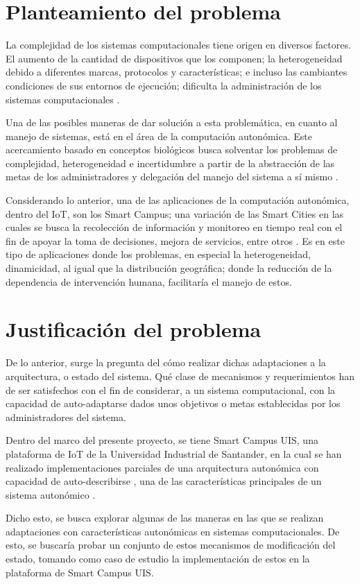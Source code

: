 \section{Planteamiento del problema}

La complejidad de los sistemas computacionales tiene origen en diversos factores. El aumento de la cantidad de dispositivos que los componen; la heterogeneidad debido a diferentes marcas, protocolos y características; e incluso las cambiantes condiciones de sus entornos de ejecución; dificulta la administración de los sistemas computacionales \cite{emerging_2005}.

Una de las posibles maneras de dar solución a esta problemática, en cuanto al manejo de sistemas, está en el área de la computación autonómica. Este acercamiento basado en conceptos biológicos busca solventar los problemas de complejidad, heterogeneidad e incertidumbre \cite{emerging_2005} a partir de la abstracción de las metas de los administradores y delegación del manejo del sistema a sí mismo \cite{lalanda_diaconescu_mccann_2014}.

Considerando lo anterior, una de las aplicaciones de la computación autonómica, dentro del IoT, son los Smart Campus; una variación de las Smart Cities en las cuales se busca la recolección de información y monitoreo en tiempo real con el fin de apoyar la toma de decisiones, mejora de servicios, entre otros \cite{MinAllah2020}. Es en este tipo de aplicaciones donde los problemas, en especial la heterogeneidad, dinamicidad, al igual que la distribución geográfica; donde la reducción de la dependencia de intervención humana, facilitaría el manejo de estos. 

\section{Justificación del problema} 

De lo anterior, surge la pregunta del cómo realizar dichas adaptaciones a la arquitectura, o estado del sistema. Qué clase de mecanismos y requerimientos han de ser satisfechos con el fin de considerar, a un sistema computacional, con la capacidad de auto-adaptarse dados unos objetivos o metas establecidas por los administradores del sistema.

Dentro del marco del presente proyecto, se tiene Smart Campus UIS, una plataforma de IoT de la Universidad Industrial de Santander, en la cual se han realizado implementaciones parciales de una arquitectura autonómica con capacidad de auto-describirse \cite{msc_henry_2022}, una de las características principales de un sistema autonómico \cite{horn_2001}. 

Dicho esto, se busca explorar algunas de las maneras en las que se realizan adaptaciones con características autonómicas en sistemas computacionales. De esto, se buscaría probar un conjunto de estos mecanismos de modificación del estado, tomando como caso de estudio la implementación de estos en la plataforma de Smart Campus UIS.
